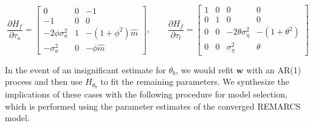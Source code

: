 $$ \frac{\partial H_f}{\partial \tau_o} = \left[ \begin{array}{ccc}
    0 & 0 & -1 \\
    -1 & 0 & 0 \\
    -2\phi\sigma_a^2 & 1 & -(1 + \phi^2)\hat{m} \\
    -\sigma_a^2 & 0 & -\phi\hat{m}
\end{array}\right], \qquad \frac{\partial H_f}{\partial \tau_l} = \left[ \begin{array}{cccc}
    1 & 0 & 0 & 0 \\
    0 & 1 & 0 & 0 \\
    0 & 0 & -2\theta\sigma_\eta^2 & -(1+\theta^2) \\
    0& 0 &  \sigma_\eta^2 & \theta
\end{array}\right] $$


In the event of an insignificant estimate for $\theta_b$, we would refit $\mathbf{w}$ with an AR(1) process and then use $H_{\theta_b}$ to fit the remaining parameters. We synthesize the implications of these cases with the following procedure for model selection, which is performed using the parameter estimates of the converged REMARCS model.



